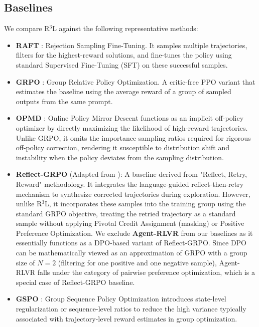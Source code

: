 \subsection{Baselines}
We compare R$^3$L against the following representative methods:
\begin{itemize}
    \item \textbf{RAFT} \cite{dongraft}: Rejection Sampling Fine-Tuning. It samples multiple trajectories, filters for the highest-reward solutions, and fine-tunes the policy using standard Supervised Fine-Tuning (SFT) on these successful samples.
    \item \textbf{GRPO} \cite{shao2024deepseekmath}: Group Relative Policy Optimization. A critic-free PPO variant that estimates the baseline using the average reward of a group of sampled outputs from the same prompt.
    \item \textbf{OPMD} \cite{yao2025group}: Online Policy Mirror Descent functions as an implicit off-policy optimizer by directly maximizing the likelihood of high-reward trajectories. Unlike GRPO, it omits the importance sampling ratios required for rigorous off-policy correction, rendering it susceptible to distribution shift and instability when the policy deviates from the sampling distribution.
    \item \textbf{Reflect-GRPO} (Adapted from \cite{bensal2025reflect}): A baseline derived from "Reflect, Retry, Reward" methodology. It integrates the language-guided reflect-then-retry mechanism to synthesize corrected trajectories during exploration. However, unlike R$^3$L, it incorporates these samples into the training group using the standard GRPO objective, treating the retried trajectory as a standard sample without applying Pivotal Credit Assignment (masking) or Positive Preference Optimization. We exclude \textbf{Agent-RLVR} \cite{da2025agent} from our baselines as it essentially functions as a DPO-based variant of Reflect-GRPO. Since DPO can be mathematically viewed as an approximation of GRPO with a group size of $N=2$ (filtering for one positive and one negative sample), Agent-RLVR falls under the category of pairwise preference optimization, which is a special case of Reflect-GRPO baseline.
    \item \textbf{GSPO} \cite{zheng2025group}: Group Sequence Policy Optimization introduces state-level regularization or sequence-level ratios to reduce the high variance typically associated with trajectory-level reward estimates in group optimization.
\end{itemize}

